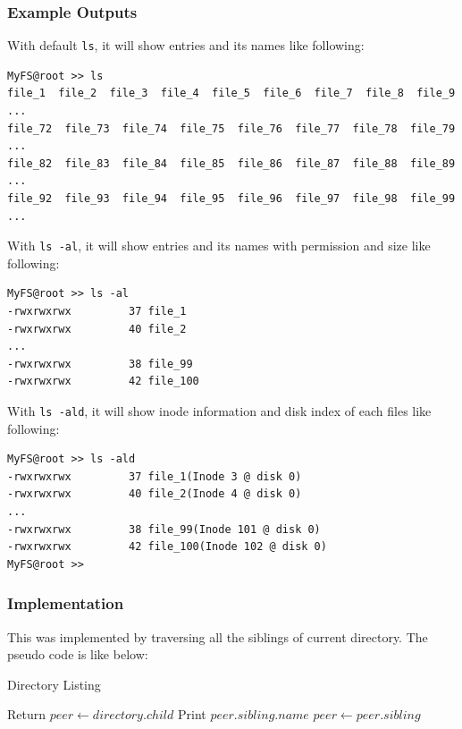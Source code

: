 \documentclass{homework}
\begin{document}
\subsubsection{Example Outputs}
\par
With default \texttt{ls}, it will show entries and its names like following:
\\
\begin{center}
\begin{code}
\begin{verbatim}
MyFS@root >> ls
file_1  file_2  file_3  file_4  file_5  file_6  file_7  file_8  file_9  ...
file_72  file_73  file_74  file_75  file_76  file_77  file_78  file_79  ...
file_82  file_83  file_84  file_85  file_86  file_87  file_88  file_89  ...
file_92  file_93  file_94  file_95  file_96  file_97  file_98  file_99  ...
\end{verbatim}
\end{code}
\end{center}
With \texttt{ls -al}, it will show entries and its names with permission and size like following:
\\
\begin{center}
\begin{code}
\begin{verbatim}
MyFS@root >> ls -al
-rwxrwxrwx         37 file_1
-rwxrwxrwx         40 file_2
...
-rwxrwxrwx         38 file_99
-rwxrwxrwx         42 file_100
\end{verbatim}
\end{code}
\end{center}
With \texttt{ls -ald}, it will show inode information and disk index of each files like following:
\\
\begin{center}
\begin{code}
\begin{verbatim}
MyFS@root >> ls -ald
-rwxrwxrwx         37 file_1(Inode 3 @ disk 0)
-rwxrwxrwx         40 file_2(Inode 4 @ disk 0)
...
-rwxrwxrwx         38 file_99(Inode 101 @ disk 0)
-rwxrwxrwx         42 file_100(Inode 102 @ disk 0)
MyFS@root >>
\end{verbatim}
\end{code}
\end{center}
\pagebreak
\subsubsection{Implementation}
This was implemented by traversing all the siblings of current directory. The pseudo code is like below:
\begin{algorithm}
\caption{Directory Listing}\label{alg:cap}
\begin{algorithmic}
     
        \State Return
    \Else
        \State $peer \gets directory.child$
         
            \State Print $peer.sibling.name$
            \State $peer \gets peer.sibling$
        \EndWhile
    \EndIf
\end{algorithmic}
\end{algorithm}
\end{document}
